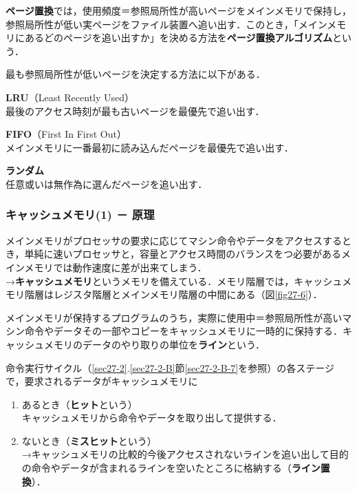 \textbf{ページ置換}では，使用頻度＝参照局所性が高いページをメインメモリで保持し，参照局所性が低い実ページをファイル装置へ追い出す．このとき，「メインメモリにあるどのページを追い出すか」を決める方法を\textbf{ページ置換アルゴリズム}という．

最も参照局所性が低いページを決定する方法に以下がある．
\begin{enumerate}[label=\textbf{[\arabic*]}, labelsep=10pt, leftmargin=23pt]
	\item \textbf{LRU}（Least Recently Used）\\
		最後のアクセス時刻が最も古いページを最優先で追い出す．
	\item \textbf{FIFO}（First In First Out）\\
		メインメモリに一番最初に読み込んだページを最優先で追い出す．
	\item \textbf{ランダム}\\
		任意或いは無作為に選んだページを追い出す．
\end{enumerate}



\subsubsection{キャッシュメモリ(1) － 原理}\label{sec27-2-D-9}

メインメモリがプロセッサの要求に応じてマシン命令やデータをアクセスするとき，単純に速いプロセッサと，容量とアクセス時間のバランスをつ必要があるメインメモリでは動作速度に差が出来てしまう．\\
→\textbf{キャッシュメモリ}というメモリを備えている．メモリ階層では，キャッシュメモリ階層はレジスタ階層とメインメモリ階層の中間にある（図\ref{fig27-6}）．

メインメモリが保持するプログラムのうち，実際に使用中＝参照局所性が高いマシン命令やデータその一部やコピーをキャッシュメモリに一時的に保持する．キャッシュメモリのデータのやり取りの単位を\textbf{ライン}という．

命令実行サイクル（\ref{sec27-2}.\ref{sec27-2-B}節\ref{sec27-2-B-7}を参照）の各ステージで，要求されるデータがキャッシュメモリに
\begin{enumerate}[label=\textbf{(\alph*)}, labelsep=10pt, leftmargin=23pt]
	\item \textsf{ある}とき（\textbf{ヒット}という）\\
		キャッシュメモリから命令やデータを取り出して提供する．
	\item \textsf{ない}とき（\textbf{ミスヒット}という）\\
		→キャッシュメモリの比較的今後アクセスされないラインを追い出して目的の命令やデータが含まれるラインを空いたところに格納する（\textbf{ライン置換}）．
\end{enumerate}



